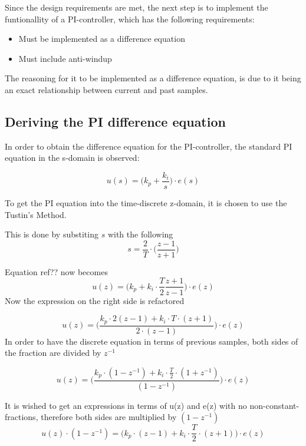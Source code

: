 \documentclass[../../../main]{subfiles}
\begin{document}
Since the design requirements are met, the next step is to implement the funtionallity of a PI-controller, which has the following requirements:
\begin{itemize}
    \item Must be implemented as a difference equation
    \item Must include anti-windup
\end{itemize}
The reasoning for it to be implemented as a difference equation, is due to it being an exact relationship between current and past samples.

\subsection{Deriving the PI difference equation}

In order to obtain the difference equation for the PI-controller, the standard PI equation in the s-domain is observed:

\begin{equation}
  u(s) = \Bigg(k_p + \frac{k_i}{s} \Bigg) \cdot e(s)
\end{equation}


To get the PI equation into the time-discrete z-domain, it is chosen to use the Tustin's Method.

This is done by substiting $s$ with the following
$$
s = \frac{2}{T}\cdot \Bigg( \frac{z-1}{z+1}\Bigg)
$$

Equation ref??  now becomes
$$
  u(z) = \Bigg(k_p + k_i\cdot \frac{T}{2} \frac{z+1}{z-1} \Bigg) \cdot e(z)
$$
Now the expression on the right side is refactored

$$
  u(z) = \Bigg( \frac{k_p \cdot 2(z-1) + k_i \cdot T \cdot (z+1)}{2\cdot (z-1)}\Bigg) \cdot e(z)
$$
In order to have the discrete equation in terms of previous samples, both sides of the fraction are divided by $z^{-1}$

$$
  u(z) = \Bigg( \frac{k_p \cdot(1-z^{-1}) + k_i \cdot \frac{T}{2} \cdot (1+z^{-1}) }{(1-z^{-1})}\Bigg) \cdot e(z)
$$

It is wished to get an expressions in terms of u(z) and e(z) with no non-constant-fractions, therefore both sides are multiplied by $(1 - z^{-1})$
$$
  u(z)\cdot(1 - z^{-1}) = \Bigg( k_p \cdot(z-1) + k_i \cdot \frac{T}{2} \cdot (z+1) \Bigg) \cdot e(z)
$$
\end{document}
